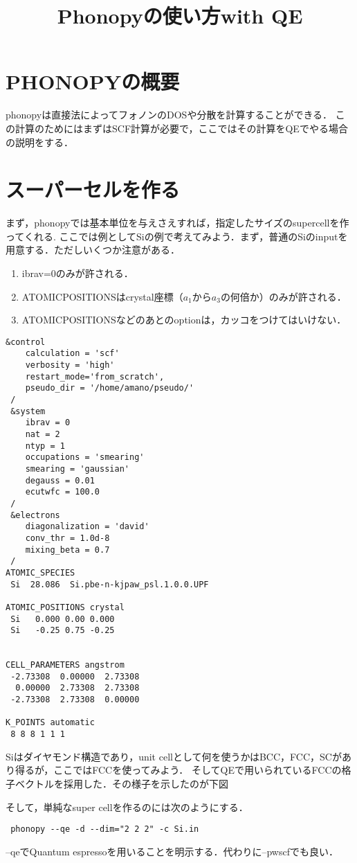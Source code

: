 \documentclass[a4j]{jarticle}
\title{Phonopyの使い方with QE}
\begin{document}
\section{PHONOPYの概要}
phonopyは直接法によってフォノンのDOSや分散を計算することができる．
この計算のためにはまずはSCF計算が必要で，ここではその計算をQEでやる場合の説明をする．



\section{スーパーセルを作る}
まず，phonopyでは基本単位を与えさえすれば，指定したサイズのsupercellを作ってくれる.
ここでは例としてSiの例で考えてみよう．まず，普通のSiのinputを用意する．ただしいくつか注意がある．
\begin{enumerate}
 \item ibrav=0のみが許される．
 \item ATOMICPOSITIONSはcrystal座標（$a_1$から$a_3$の何倍か）のみが許される．
 \item ATOMICPOSITIONSなどのあとのoptionは，カッコをつけてはいけない．
\end{enumerate}

\begin{lstlisting}
&control
    calculation = 'scf'
    verbosity = 'high'
    restart_mode='from_scratch',
    pseudo_dir = '/home/amano/pseudo/'
 /
 &system
    ibrav = 0
    nat = 2
    ntyp = 1
    occupations = 'smearing'
    smearing = 'gaussian'
    degauss = 0.01
    ecutwfc = 100.0
 /
 &electrons
    diagonalization = 'david'
    conv_thr = 1.0d-8
    mixing_beta = 0.7
 /
ATOMIC_SPECIES
 Si  28.086  Si.pbe-n-kjpaw_psl.1.0.0.UPF

ATOMIC_POSITIONS crystal
 Si   0.000 0.00 0.000
 Si   -0.25 0.75 -0.25 


CELL_PARAMETERS angstrom
 -2.73308  0.00000  2.73308
  0.00000  2.73308  2.73308
 -2.73308  2.73308  0.00000

K_POINTS automatic
 8 8 8 1 1 1

\end{lstlisting}
Siはダイヤモンド構造であり，unit cellとして何を使うかはBCC，FCC，SCがあり得るが，ここではFCCを使ってみよう．
そしてQEで用いられているFCCの格子ベクトルを採用した．その様子を示したのが下図
\begin{figure}[htb]
 \centering
\end{figure}




そして，単純なsuper cellを作るのには次のようにする．
\begin{lstlisting}
 phonopy --qe -d --dim="2 2 2" -c Si.in
\end{lstlisting}
--qeでQuantum espressoを用いることを明示する．代わりに--pwscfでも良い．
\end{document}
